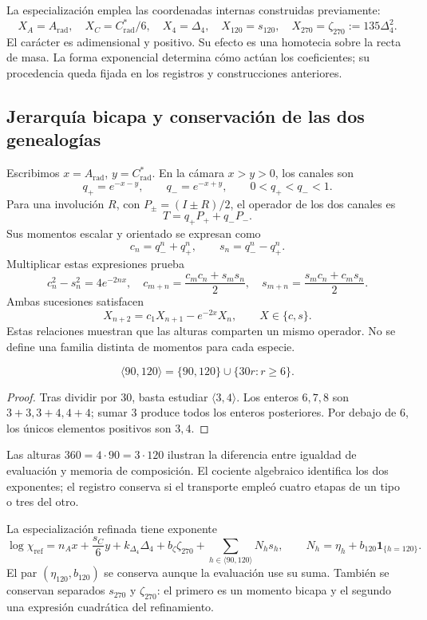 La especialización emplea las coordenadas internas construidas previamente:
\[
 X_A=A_{\mathrm{rad}},\quad X_C=C^*_{\mathrm{rad}}/6,
 \quad X_4=\Delta_4,\quad X_{120}=s_{120},\quad
 X_{270}=\zeta_{270}:=135\Delta_4^2.
\]
El carácter es adimensional y positivo. Su efecto es una homotecia sobre
la recta de masa. La forma exponencial determina cómo actúan los
coeficientes; su procedencia queda fijada en los registros y construcciones
anteriores.

\subsection{Jerarquía bicapa y conservación de las dos genealogías}

Escribimos \(x=A_{\mathrm{rad}}\), \(y=C^*_{\mathrm{rad}}\). En la
cámara \(x>y>0\), los canales son
\[
 q_+=e^{-x-y},\qquad q_-=e^{-x+y},\qquad0<q_+<q_-<1.
\]
Para una involución \(R\), con \(P_\pm=(I\pm R)/2\), el operador
de los dos canales es
\[
 T=q_+P_++q_-P_-.
\]
Sus momentos escalar y orientado se expresan como
\[
 c_n=q_-^n+q_+^n,\qquad s_n=q_-^n-q_+^n.
\]
Multiplicar estas expresiones prueba
\[
 c_n^2-s_n^2=4e^{-2nx},\quad
 c_{m+n}=\frac{c_mc_n+s_ms_n}{2},\quad
 s_{m+n}=\frac{s_mc_n+c_ms_n}{2}.
\]
Ambas sucesiones satisfacen
\[
 X_{n+2}=c_1X_{n+1}-e^{-2x}X_n,\qquad X\in\{c,s\}.
\]
Estas relaciones muestran que las alturas comparten un mismo operador.
No se define una familia distinta de momentos para cada especie.

\begin{proposition}
\[
 \langle90,120\rangle=\{90,120\}\cup\{30r:r\ge6\}.
\]
\end{proposition}
\begin{proof}
Tras dividir por \(30\), basta estudiar \(\langle3,4\rangle\).
Los enteros \(6,7,8\) son \(3+3,3+4,4+4\); sumar \(3\) produce
todos los enteros posteriores. Por debajo de \(6\), los únicos
elementos positivos son \(3,4\).
\end{proof}

Las alturas \(360=4\cdot90=3\cdot120\) ilustran la diferencia entre
igualdad de evaluación y memoria de composición. El cociente algebraico
identifica los dos exponentes; el registro conserva si el transporte
empleó cuatro etapas de un tipo o tres del otro.

La especialización refinada tiene exponente
\[
 \log\chi_{\mathrm{ref}}=n_Ax+\frac{s_C}{6}y+k_{\Delta_4}\Delta_4
 +b_{\zeta}\zeta_{270}+\sum_{h\in\langle90,120\rangle}N_hs_h,
 \qquad N_h=\eta_h+b_{120}\mathbf1_{\{h=120\}}.
\]
El par \((\eta_{120},b_{120})\) se conserva aunque la evaluación use
su suma. También se conservan separados \(s_{270}\) y
\(\zeta_{270}\): el primero es un momento bicapa y el segundo una
expresión cuadrática del refinamiento.

